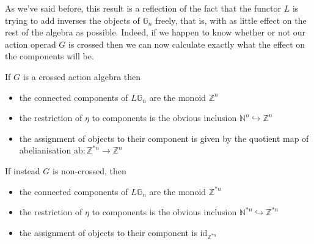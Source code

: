 As we've said before, this result is a reflection of the fact that the functor $L$ is trying to add inverses the objects of $\mathbb{G}_n$ freely, that is, with as little effect on the rest of the algebra as possible. Indeed, if we happen to know whether or not our action operad $G$ is crossed then we can now calculate exactly what the effect on the components will be.

\begin{cor}\label{crossconcomp} If $G$ is a crossed action algebra then
\begin{itemize} \itemsep0em
\item the connected components of $L\mathbb{G}_n$ are the monoid $\mathbb{Z}^n$
\item the restriction of $\eta$ to components is the obvious inclusion $\mathbb{N}^n \hookrightarrow \mathbb{Z}^n$
\item the assignment of objects to their component is given by the quotient map of abelianisation $\mathrm{ab}: \mathbb{Z}^{\ast n} \to \mathbb{Z}^n$
\end{itemize}
If instead $G$ is non-crossed, then
\begin{itemize} \itemsep0em
\item the connected components of $L\mathbb{G}_n$ are the monoid $\mathbb{Z}^{\ast n}$
\item the restriction of $\eta$ to components is the obvious inclusion $\mathbb{N}^{\ast n} \hookrightarrow \mathbb{Z}^{\ast n}$
\item the assignment of objects to their component is $\mathrm{id}_{\mathbb{Z}^{\ast n}}$
\end{itemize}
\end{cor}
